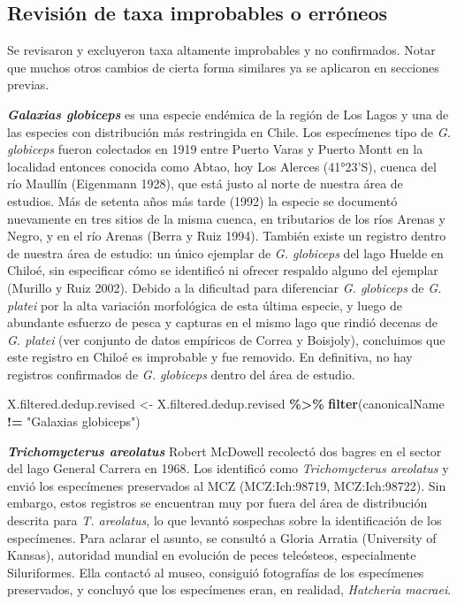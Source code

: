 \documentclass[sn-apa,pdflatex]{sn-jnl}
\newenvironment{Shaded}{\begin{snugshade}}{\end{snugshade}}
\newcommand{\FunctionTok}[1]{\textcolor[rgb]{0.13,0.29,0.53}{\textbf{#1}}}
\newcommand{\NormalTok}[1]{#1}
\newcommand{\OtherTok}[1]{\textcolor[rgb]{0.56,0.35,0.01}{#1}}
\newcommand{\SpecialCharTok}[1]{\textcolor[rgb]{0.81,0.36,0.00}{\textbf{#1}}}
\newcommand{\StringTok}[1]{\textcolor[rgb]{0.31,0.60,0.02}{#1}}
\begin{document}
\subsection{Revisión de taxa improbables o
erróneos}\label{revisiuxf3n-de-taxa-improbables-o-erruxf3neos}

Se revisaron y excluyeron taxa altamente improbables y no confirmados.
Notar que muchos otros cambios de cierta forma similares ya se aplicaron
en secciones previas.

\textbf{\emph{Galaxias globiceps}} es una especie endémica de la región
de Los Lagos y una de las especies con distribución más restringida en
Chile. Los especímenes tipo de \emph{G. globiceps} fueron colectados en
1919 entre Puerto Varas y Puerto Montt en la localidad entonces conocida
como Abtao, hoy Los Alerces (41°23'S), cuenca del río Maullín (Eigenmann
1928), que está justo al norte de nuestra área de estudios. Más de
setenta años más tarde (1992) la especie se documentó nuevamente en tres
sitios de la misma cuenca, en tributarios de los ríos Arenas y Negro, y
en el río Arenas (Berra y Ruiz 1994). También existe un registro dentro
de nuestra área de estudio: un único ejemplar de \emph{G. globiceps} del
lago Huelde en Chiloé, sin especificar cómo se identificó ni ofrecer
respaldo alguno del ejemplar (Murillo y Ruiz 2002). Debido a la
dificultad para diferenciar \emph{G. globiceps} de \emph{G. platei} por
la alta variación morfológica de esta última especie, y luego de
abundante esfuerzo de pesca y capturas en el mismo lago que rindió
decenas de \emph{G. platei} (ver conjunto de datos empíricos de Correa y
Boisjoly), concluimos que este registro en Chiloé es improbable y fue
removido. En definitiva, no hay registros confirmados de \emph{G.
globiceps} dentro del área de estudio.

\begin{Shaded}
\begin{Highlighting}[]
\NormalTok{X.filtered.dedup.revised }\OtherTok{\textless{}{-}}\NormalTok{ X.filtered.dedup.revised }\SpecialCharTok{\%\textgreater{}\%}
    \FunctionTok{filter}\NormalTok{(canonicalName }\SpecialCharTok{!=} \StringTok{"Galaxias globiceps"}\NormalTok{)}
\end{Highlighting}
\end{Shaded}

\textbf{\emph{Trichomycterus areolatus}} Robert McDowell recolectó dos
bagres en el sector del lago General Carrera en 1968. Los identificó
como \emph{Trichomycterus areolatus} y envió los especímenes preservados
al MCZ (MCZ:Ich:98719, MCZ:Ich:98722). Sin embargo, estos registros se
encuentran muy por fuera del área de distribución descrita para \emph{T.
areolatus}, lo que levantó sospechas sobre la identificación de los
especímenes. Para aclarar el asunto, se consultó a Gloria Arratia
(University of Kansas), autoridad mundial en evolución de peces
teleósteos, especialmente Siluriformes. Ella contactó al museo,
consiguió fotografías de los especímenes preservados, y concluyó que los
especímenes eran, en realidad, \emph{Hatcheria macraei}.
\end{document}
